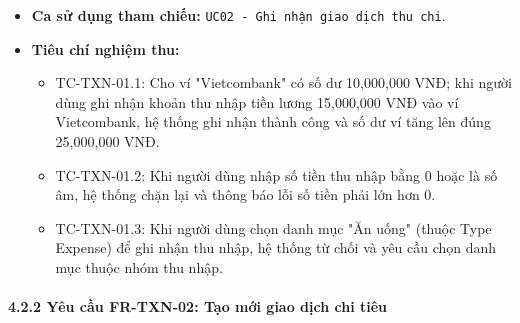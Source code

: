 \documentclass[11pt,a4paper]{article}
\providecommand{\tightlist}{
  \setlength{\itemsep}{0pt}\setlength{\parskip}{0pt}}
\begin{document}
\begin{itemize}
  \begin{itemize}
  \tightlist
  \item
    Bản ghi giao dịch thu nhập mới được lưu vào cơ sở dữ liệu kèm mã
    \texttt{txnId}.
  \item
    Số dư ví nhận tiền tăng thêm đúng bằng số tiền thu nhập.
  \item
    Thông báo ghi nhận giao dịch thành công.
  \end{itemize}
\item
  \textbf{Ca sử dụng tham chiếu:}
  \texttt{UC02\ -\ Ghi\ nhận\ giao\ dịch\ thu\ chi}.
\item
  \textbf{Tiêu chí nghiệm thu:}

  \begin{itemize}
  \tightlist
  \item
    TC-TXN-01.1: Cho ví "Vietcombank" có số dư 10,000,000 VNĐ; khi người
    dùng ghi nhận khoản thu nhập tiền lương 15,000,000 VNĐ vào ví
    Vietcombank, hệ thống ghi nhận thành công và số dư ví tăng lên đúng
    25,000,000 VNĐ.
  \item
    TC-TXN-01.2: Khi người dùng nhập số tiền thu nhập bằng 0 hoặc là số
    âm, hệ thống chặn lại và thông báo lỗi số tiền phải lớn hơn 0.
  \item
    TC-TXN-01.3: Khi người dùng chọn danh mục "Ăn uống" (thuộc Type
    Expense) để ghi nhận thu nhập, hệ thống từ chối và yêu cầu chọn danh
    mục thuộc nhóm thu nhập.
  \end{itemize}
\end{itemize}

\newpage

\paragraph{4.2.2 Yêu cầu FR-TXN-02: Tạo mới giao dịch chi
tiêu}\label{422-yuxeau-cux1ea7u-fr-txn-02-tux1ea1o-mux1edbi-giao-dux1ecbch-chi-tiuxeau}
\end{document}
